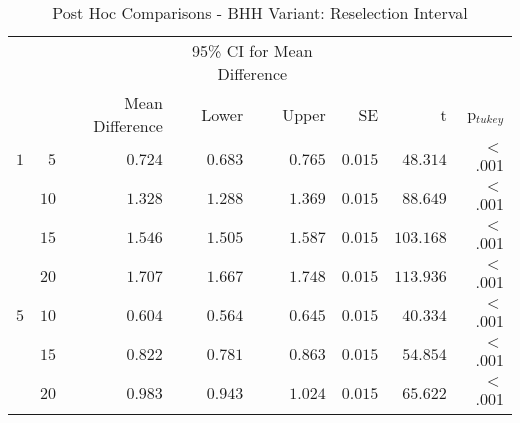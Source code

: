 \begin{table}[htb]
	\centering
	\caption{Post Hoc Comparisons - BHH Variant: Reselection Interval}
	\label{tab:results:reselection:post_hoc}%
	\par\bigskip
	\resizebox{\textwidth}{!}
	{
		\begin{tabular}{lrrrrrrr}
			\toprule
			\multicolumn{1}{c}{} & \multicolumn{1}{c}{} & \multicolumn{1}{c}{} & \multicolumn{2}{c}{95\% CI for Mean Difference} & \multicolumn{1}{c}{} & \multicolumn{1}{c}{} & \multicolumn{1}{c}{}               \\
			\cline{4-5}
			$ $                  & $ $                  & Mean Difference      & Lower                                           & Upper                & SE                   & t                    & p$_{tukey}$ \\
			\cmidrule[0.4pt]{1-8}
			$1$                  & $5$                  & $0.724$              & $0.683$                                         & $0.765$              & $0.015$              & $48.314$             & $<$ .001    \\
			$ $                  & $10$                 & $1.328$              & $1.288$                                         & $1.369$              & $0.015$              & $88.649$             & $<$ .001    \\
			                     & $15$                 & $1.546$              & $1.505$                                         & $1.587$              & $0.015$              & $103.168$            & $<$ .001    \\
			                     & $20$                 & $1.707$              & $1.667$                                         & $1.748$              & $0.015$              & $113.936$            & $<$ .001    \\
			$5$                  & $10$                 & $0.604$              & $0.564$                                         & $0.645$              & $0.015$              & $40.334$             & $<$ .001    \\
			$ $                  & $15$                 & $0.822$              & $0.781$                                         & $0.863$              & $0.015$              & $54.854$             & $<$ .001    \\
			                     & $20$                 & $0.983$              & $0.943$                                         & $1.024$              & $0.015$              & $65.622$             & $<$ .001    \\

\end{tabular}}
\end{table}
